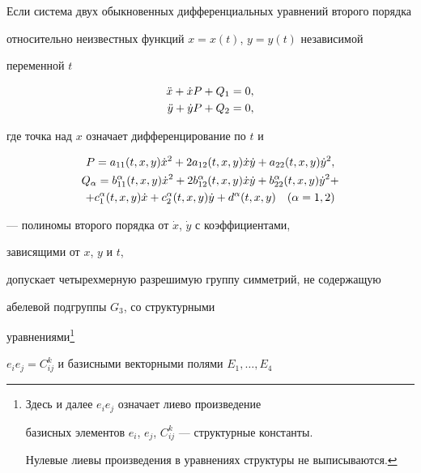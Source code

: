 \begin{thms}\label{th8}


Если система двух обыкновенных дифференциальных уравнений второго порядка


относительно неизвестных функций $x=x(t)$, $y=y(t)$ независимой


переменной $t$ 


\begin{align*}


\Ddot x + \Dot x P +Q_1&=0,\\


\Ddot y + \Dot y P +Q_2&=0,


\end{align*}


где точка над $x$ означает дифференцирование по $t$ и


\begin{gather}


P=a_{11}(t,x,y)\Dot x^2 + 2a_{12}(t,x,y)\Dot x\Dot y+


a_{22}(t,x,y)\Dot y^2,\notag \\


%


\label{sys2}


Q_\alpha=b^\alpha_{11}(t,x,y)\Dot x^2 + 2b^\alpha_{12}(t,x,y)\Dot x\Dot y+


b^\alpha_{22}(t,x,y)\Dot y^2 +\\


%


+c^\alpha_1(t,x,y)\Dot x


+c^\alpha_2(t,x,y)\Dot y+d^\alpha(t,x,y)


\quad(\alpha=1,2)\notag


\end{gather}


--- полиномы второго порядка от $\Dot x$, $\Dot y$ с коэффициентами,


зависящими от $x$, $y$ и $t$,


допускает четырехмерную разрешимую группу симметрий, не содержащую


абелевой подгруппы $G_3$, со структурными 


уравнениями\footnote{Здесь и далее $e_ie_j$ означает лиево произведение


базисных элементов $e_i$, $e_j$, $C^k_{ij}$ --- структурные константы.


Нулевые лиевы произведения в уравнениях структуры не выписываются.}


$e_ie_j=C^k_{ij}$ и базисными векторными полями $E_1,\dotsc,E_4$



\end{thms}
